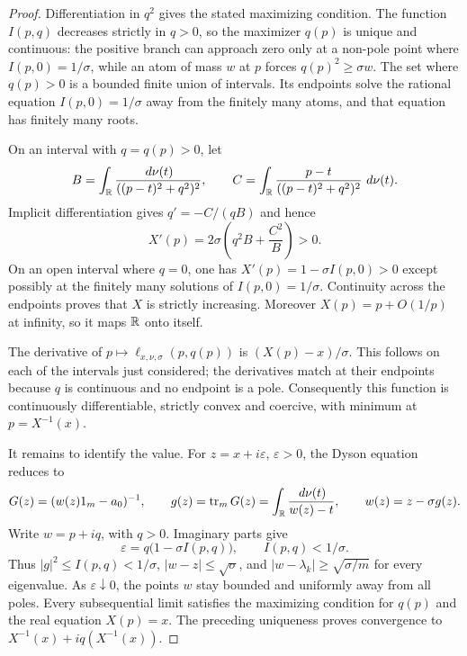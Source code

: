 \begin{proof}
Differentiation in $q^2$ gives the stated maximizing condition.
The function $I(p,q)$ decreases strictly in $q>0$, so the maximizer $q(p)$ is unique and continuous: the positive branch can approach zero only at a non-pole point where $I(p,0)=1/\sigma$, while an atom of mass $w$ at $p$ forces $q(p)^2\ge\sigma w$.
The set where $q(p)>0$ is a bounded finite union of intervals.
Its endpoints solve the rational equation $I(p,0)=1/\sigma$ away from the finitely many atoms, and that equation has finitely many roots.

On an interval with $q=q(p)>0$, let
\[
 B=\int_\mathbb R\frac{\,d\nu(t)}{((p-t)^2+q^2)^2},
 \qquad
 C=\int_\mathbb R\frac{p-t}{((p-t)^2+q^2)^2}\,\,d\nu(t).
\]
Implicit differentiation gives $q'=-C/(qB)$ and hence
\begin{equation}\label{eq:minmax-isotropic-monotonicity}
 X'(p)=2\sigma\left(q^2B+\frac{C^2}{B}\right)>0.
\end{equation}
On an open interval where $q=0$, one has $X'(p)=1-\sigma I(p,0)>0$ except possibly at the finitely many solutions of $I(p,0)=1/\sigma$.
Continuity across the endpoints proves that $X$ is strictly increasing.
Moreover $X(p)=p+O(1/p)$ at infinity, so it maps $\mathbb R$ onto itself.

The derivative of $p\mapsto\ell_{x,\nu,\sigma}(p,q(p))$ is $(X(p)-x)/\sigma$.
This follows on each of the intervals just considered; the derivatives match at their endpoints because $q$ is continuous and no endpoint is a pole.
Consequently this function is continuously differentiable, strictly convex and coercive, with minimum at $p=X^{-1}(x)$.

It remains to identify the value.
For $z=x+i\varepsilon$, $\varepsilon>0$, the Dyson equation reduces to
\begin{equation}\label{eq:minmax-isotropic-dyson}
 G(z)=(w(z)1_m-a_0)^{-1},\qquad
 g(z)=\operatorname{tr}_mG(z)=\int_\mathbb R\frac{\,d\nu(t)}{w(z)-t},\qquad
 w(z)=z-\sigma g(z).
\end{equation}
Write $w=p+iq$, with $q>0$.
Imaginary parts give
\[
 \varepsilon=q\bigl(1-\sigma I(p,q)\bigr),
 \qquad I(p,q)<1/\sigma.
\]
Thus $|g|^2\le I(p,q)<1/\sigma$, $|w-z|\le\sqrt\sigma$, and $|w-\lambda_k|\ge\sqrt{\sigma/m}$ for every eigenvalue.
As $\varepsilon\downarrow0$, the points $w$ stay bounded and uniformly away from all poles.
Every subsequential limit satisfies the maximizing condition for $q(p)$ and the real equation $X(p)=x$.
The preceding uniqueness proves convergence to $X^{-1}(x)+i q(X^{-1}(x))$.


\end{proof}
